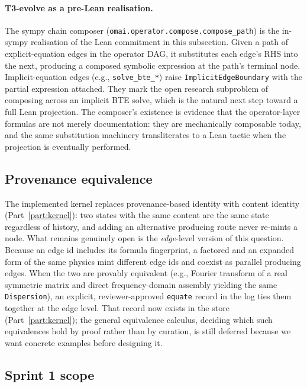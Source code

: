 \documentclass[11pt,a4paper]{article}
\begin{document}
\paragraph{T3-evolve as a pre-Lean realisation.} The sympy chain composer
(\texttt{omai.operator.compose.compose\_path}) is the in-sympy realisation of the
Lean commitment in this subsection. Given a path of explicit-equation edges in the
operator DAG, it substitutes each edge's RHS into the next, producing a composed
symbolic expression at the path's terminal node. Implicit-equation edges (e.g.,
\texttt{solve\_bte\_*}) raise \texttt{ImplicitEdgeBoundary} with the partial
expression attached. They mark the open research subproblem of composing across
an implicit BTE solve, which is the natural next step toward a full Lean
projection. The composer's existence is evidence that the operator-layer formulas
are not merely documentation: they are mechanically composable today, and the same
substitution machinery transliterates to a Lean tactic when the projection is
eventually performed.

\subsection{Provenance equivalence}

The implemented kernel replaces provenance-based identity with content identity
(Part~\ref{part:kernel}): two states with the same content are the same state
regardless of history, and adding an alternative producing route never re-mints a
node. What remains genuinely open is the \emph{edge}-level version of this
question. Because an edge id includes its formula fingerprint, a factored and an
expanded form of the same physics mint different edge ids and coexist as parallel
producing edges. When the two are provably equivalent (e.g., Fourier transform of
a real symmetric matrix and direct frequency-domain assembly yielding the same
\texttt{Dispersion}), an explicit, reviewer-approved \texttt{equate} record in the
log ties them together at the edge level. That record now exists in the store
(Part~\ref{part:kernel}); the general equivalence calculus, deciding which such
equivalences hold by proof rather than by curation, is still deferred because we
want concrete examples before designing it.

\subsection{Sprint 1 scope}
\end{document}
